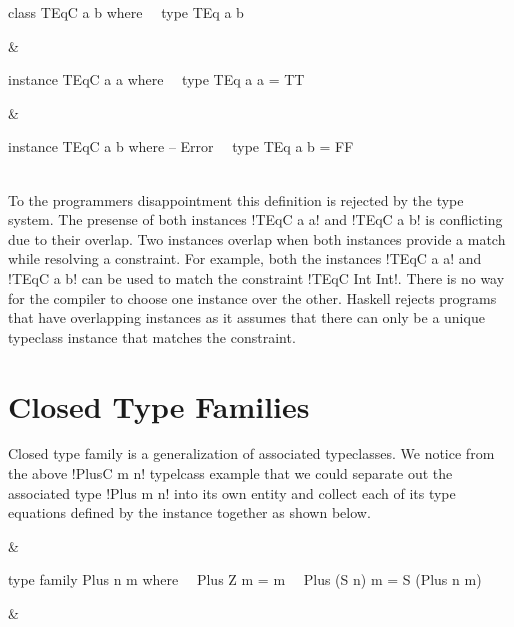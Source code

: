 \documentclass[format=acmsmall,manuscript,review,screen,nonacm,margin=1in,11pt]{acmart}
\begin{document}
{\footnotesize\centering
  \begin{tabularx}\textwidth{X X X}
\begin{code}^^J
class TEqC a b where^^J
\ \ type TEq a b^^J
\end{code}&%
\begin{code}^^J
instance TEqC a a where^^J
\ \ type TEq a a = TT^^J
\end{code}&%
\begin{code}^^J
instance TEqC a b where -- Error^^J
\ \ type TEq a b = FF^^J
\end{code}
  \end{tabularx}
}\\
To the programmers disappointment this definition is rejected by the type system.
The presense of both instances !TEqC a a! and !TEqC a b! is conflicting due to their overlap.
Two instances overlap when both instances provide a match while resolving a constraint.
For example, both the instances !TEqC a a! and !TEqC a b! can be used to match the constraint
!TEqC Int Int!. There is no way for the compiler to choose one instance over the other.
Haskell rejects programs that have overlapping instances as it assumes
that there can only be a unique typeclass instance that matches the constraint.

\section{Closed Type Families}\label{sec:tf-closed}
Closed type family is a generalization of associated typeclasses. We notice from
the above !PlusC m n! typelcass example that we could separate out the associated type !Plus m n!
into its own entity and collect each of its type equations defined by the instance together as shown below.
{\footnotesize
\begin{tabularx}\textwidth{X X X}
&\begin{code}^^J
type family Plus n m where^^J
\ \ Plus Z     m = m^^J
\ \ Plus (S n) m = S (Plus n m)^^J
\end{code}&
\end{tabularx}
}
\end{document}
